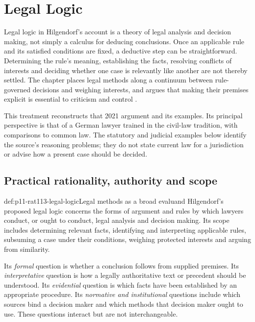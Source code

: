 \chapter{Legal Logic}
\label{sec:p11-rationality-11-3}

Legal logic in Hilgendorf's account is a theory of legal analysis and
decision making, not simply a calculus for deducing conclusions. Once an
applicable rule and its satisfied conditions are fixed, a deductive step can
be straightforward. Determining the rule's meaning, establishing the facts,
resolving conflicts of interests and deciding whether one case is relevantly
like another are not thereby settled. The chapter places legal methods along
a continuum between rule-governed decisions and weighing interests, and
argues that making their premises explicit is essential to criticism and
control \parencite[pp.~659--667]{Hilgendorf2021LegalLogic}.

This treatment reconstructs that 2021 argument and its examples. Its principal
perspective is that of a German lawyer trained in the civil-law tradition,
with comparisons to common law. The statutory and judicial examples below
identify the source's reasoning problems; they do not state current law for
a jurisdiction or advise how a present case should be decided.

\section{Practical rationality, authority and scope}
\label{sec:p11-rat113-scope}

\begin{hbdefinition}{def:p11-rat113-legal-logic}{Legal methods as a broad evaluand}
Hilgendorf's proposed legal logic concerns the forms of argument and rules
by which lawyers conduct, or ought to conduct, legal analysis and decision
making. Its scope includes determining relevant facts, identifying and
interpreting applicable rules, subsuming a case under their conditions,
weighing protected interests and arguing from similarity.

Its \emph{formal} question is whether a conclusion follows from supplied
premises. Its \emph{interpretative} question is how a legally authoritative
text or precedent should be understood. Its \emph{evidential} question is
which facts have been established by an appropriate procedure. Its
\emph{normative and institutional} questions include which sources bind a
decision maker and which methods that decision maker ought to use.
These questions interact but are not interchangeable.
\end{hbdefinition}

